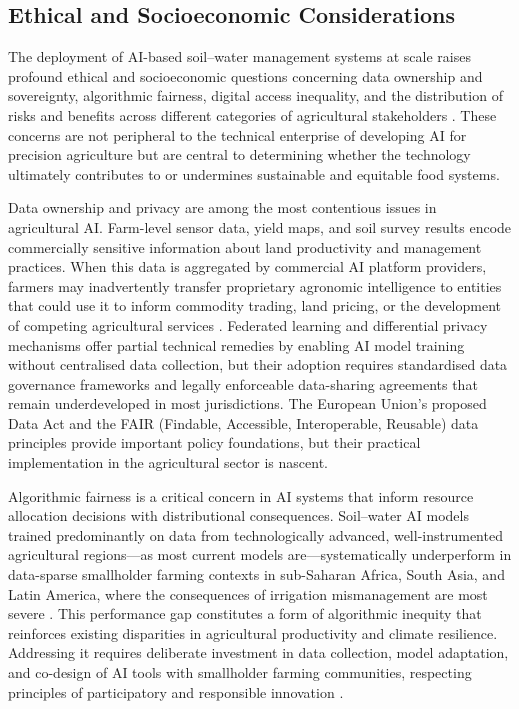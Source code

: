 \documentclass[land,article,submit,pdftex,moreauthors]{Definitions/mdpi}
\numberwithin{equation}{section}
\begin{document}
\subsection{Ethical and Socioeconomic Considerations}

The deployment of AI-based soil--water management systems at scale raises profound ethical and socioeconomic questions concerning data ownership and sovereignty, algorithmic fairness, digital access inequality, and the distribution of risks and benefits across different categories of agricultural stakeholders \citep{janssen2020responsible, shepherd2022ethics}. These concerns are not peripheral to the technical enterprise of developing AI for precision agriculture but are central to determining whether the technology ultimately contributes to or undermines sustainable and equitable food systems.

Data ownership and privacy are among the most contentious issues in agricultural AI. Farm-level sensor data, yield maps, and soil survey results encode commercially sensitive information about land productivity and management practices. When this data is aggregated by commercial AI platform providers, farmers may inadvertently transfer proprietary agronomic intelligence to entities that could use it to inform commodity trading, land pricing, or the development of competing agricultural services \citep{WolfButtel}. Federated learning and differential privacy mechanisms \citep{dwork2014algorithmic} offer partial technical remedies by enabling AI model training without centralised data collection, but their adoption requires standardised data governance frameworks and legally enforceable data-sharing agreements that remain underdeveloped in most jurisdictions. The European Union's proposed Data Act and the FAIR (Findable, Accessible, Interoperable, Reusable) data principles \citep{wilkinson2016fair} provide important policy foundations, but their practical implementation in the agricultural sector is nascent.

Algorithmic fairness is a critical concern in AI systems that inform resource allocation decisions with distributional consequences. Soil--water AI models trained predominantly on data from technologically advanced, well-instrumented agricultural regions---as most current models are---systematically underperform in data-sparse smallholder farming contexts in sub-Saharan Africa, South Asia, and Latin America, where the consequences of irrigation mismanagement are most severe \citep{Xuetal2023}. This performance gap constitutes a form of algorithmic inequity that reinforces existing disparities in agricultural productivity and climate resilience. Addressing it requires deliberate investment in data collection, model adaptation, and co-design of AI tools with smallholder farming communities, respecting principles of participatory and responsible innovation \citep{janssen2020responsible}.
\end{document}
